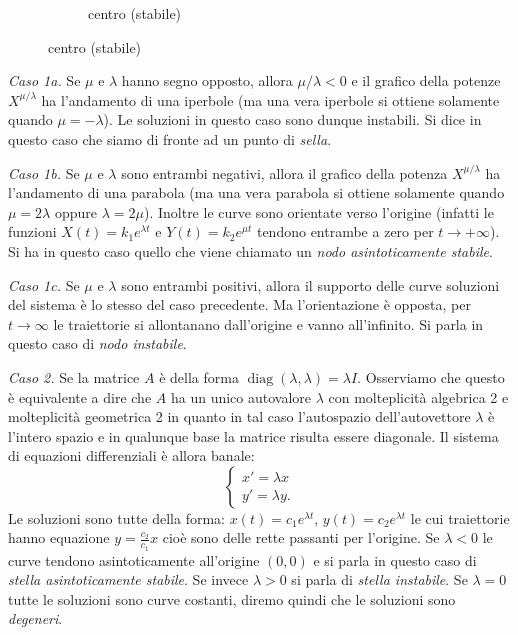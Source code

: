 \documentclass[italian,a4paper]{scrartcl}
\DeclareMathOperator{\diag}{diag}
\begin{document}
\begin{figure}
\begin{subfigure}{5cm}
  \caption{centro (stabile)}
 \end{subfigure}
\end{figure}

\emph{Caso 1a.} 
Se $\mu$ e $\lambda$ hanno segno opposto, allora
$\mu/\lambda<0$ e il grafico della potenze $X^{\mu/\lambda}$ ha
l'andamento di una iperbole (ma una vera iperbole si ottiene solamente
quando $\mu=-\lambda$). 
Le soluzioni in questo caso sono dunque
instabili.
Si dice in questo caso che siamo di fronte ad un punto di \emph{sella}.

\emph{Caso 1b.}
Se $\mu$ e $\lambda$ sono entrambi negativi, allora il
grafico della potenza $X^{\mu/\lambda}$ ha l'andamento di una parabola
(ma una vera parabola si ottiene solamente quando $\mu=2\lambda$
oppure $\lambda=2 \mu$). Inoltre le curve sono orientate verso
l'origine (infatti le funzioni $X(t)=k_1 e^{\lambda t}$ e $Y(t)=k_2
e^{\mu t}$ tendono entrambe a zero per $t\to +\infty$). Si ha in
questo caso quello che viene chiamato un \emph{nodo asintoticamente
  stabile}.

\emph{Caso 1c.} 
Se $\mu$ e $\lambda$ sono entrambi positivi, allora il
supporto delle curve soluzioni del sistema è lo stesso del caso
precedente. Ma l'orientazione è opposta, per $t\to \infty$ le
traiettorie si allontanano dall'origine e vanno all'infinito. Si parla
in questo caso di \emph{nodo instabile}.

\emph{Caso 2.} 
Se la matrice $A$ è della forma
$\diag(\lambda,\lambda)=\lambda I$. Osserviamo che questo è equivalente a dire
 che $A$ ha un unico autovalore $\lambda$ con molteplicità algebrica 2 e
molteplicità geometrica 2 in quanto in tal caso l'autospazio
dell'autovettore $\lambda$ è l'intero spazio e in qualunque base la
matrice risulta essere diagonale.
Il sistema di equazioni differenziali è allora banale:
\[
\begin{cases}
 x' = \lambda x\\
 y' = \lambda y.
\end{cases}
\]
Le soluzioni sono tutte della forma: $x(t)=c_1 e^{\lambda t}$,
$y(t)=c_2 e^{\lambda t}$ le cui traiettorie hanno equazione
$y=\frac{c_2}{c_1}x$ cioè sono delle rette passanti per l'origine.
Se $\lambda<0$ le curve tendono asintoticamente all'origine $(0,0)$ e
si parla in questo caso di \emph{stella asintoticamente stabile}.
Se invece $\lambda>0$ si parla di \emph{stella instabile}. Se $\lambda
= 0$ tutte le soluzioni sono curve costanti, diremo quindi che le
soluzioni sono \emph{degeneri}.
\end{document}
